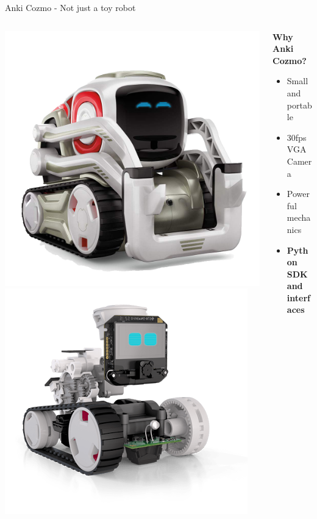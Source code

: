 \documentclass[aspectratio=169]{beamer}
\begin{document}
\begin{frame}{Anki Cozmo - Not just a toy robot}
	\begin{columns}
		\begin{column}{0.5\linewidth}
			\begin{center}
				\includegraphics[height=0.5\linewidth]{img/cozmo.png}
				\includegraphics[height=0.5\linewidth]{img/cozmo_inside.png}
			\end{center}
		\end{column}
		\begin{column}{0.5\linewidth}
			\textbf<1->{Why Anki Cozmo?}
			\begin{itemize}[<+- | alert@+>]
				\item{Small and portable}
				\item{30fps VGA Camera}
				\item{Powerful mechanics}
				\item{\textbf{Python SDK and interfaces}}
			\end{itemize}
		\end{column}
	\end{columns}
\end{frame}
\end{document}
